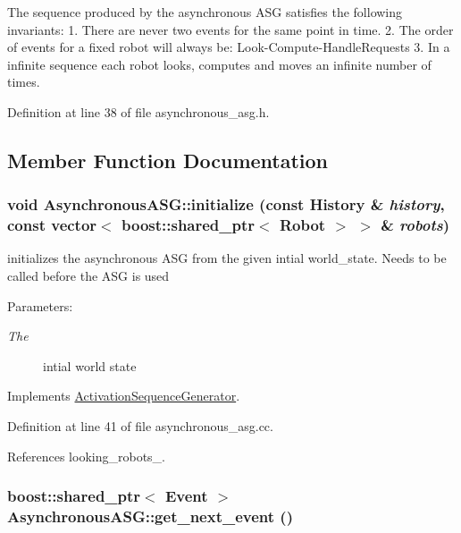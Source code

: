 The sequence produced by the asynchronous ASG satisfies the following invariants: 1. There are never two events for the same point in time. 2. The order of events for a fixed robot will always be: Look-Compute-HandleRequests 3. In a infinite sequence each robot looks, computes and moves an infinite number of times. 

Definition at line 38 of file asynchronous\_\-asg.h.

\subsection{Member Function Documentation}
\hypertarget{class_asynchronous_a_s_g_6ef9907d9f0043e45cc08a3e0d5178fa}{
\subsubsection[initialize]{\setlength{\rightskip}{0pt plus 5cm}void AsynchronousASG::initialize (const {\bf History} \& {\em history}, \/  const vector$<$ boost::shared\_\-ptr$<$ Robot $>$ $>$ \& {\em robots})}}
\label{class_asynchronous_a_s_g_6ef9907d9f0043e45cc08a3e0d5178fa}


initializes the asynchronous ASG from the given intial world\_\-state. Needs to be called before the ASG is used \begin{Desc}
\item[Parameters:]
\begin{description}
\item[{\em The}]intial world state \end{description}
\end{Desc}


Implements \hyperlink{class_activation_sequence_generator_01592eb2b4293512d2ad00dc4adf0361}{ActivationSequenceGenerator}.

Definition at line 41 of file asynchronous\_\-asg.cc.

References looking\_\-robots\_\-.\hypertarget{class_asynchronous_a_s_g_cbec6379ed8ba4ea1351e2b1d76b9671}{
\subsubsection[get\_\-next\_\-event]{\setlength{\rightskip}{0pt plus 5cm}boost::shared\_\-ptr$<$ Event $>$ AsynchronousASG::get\_\-next\_\-event ()}}
\label{class_asynchronous_a_s_g_cbec6379ed8ba4ea1351e2b1d76b9671}


